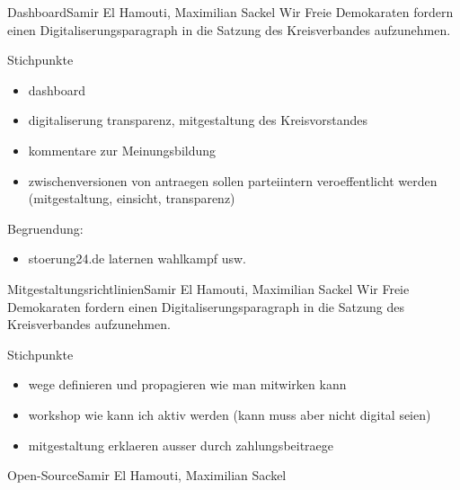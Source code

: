 \documentclass{amendment}
\date{18. August 2020}
\begin{document}
\begin{boxed}{Dashboard}{Samir El Hamouti, Maximilian Sackel}
Wir Freie Demokaraten fordern einen Digitaliserungsparagraph in die Satzung des
Kreisverbandes aufzunehmen.

Stichpunkte
\begin{itemize}
    \item dashboard
    \item digitaliserung transparenz, mitgestaltung des Kreisvorstandes
    \item kommentare zur Meinungsbildung
    \item zwischenversionen von antraegen sollen parteiintern veroeffentlicht
        werden (mitgestaltung, einsicht, transparenz)
\end{itemize}
Begruendung:
\begin{itemize}
    \item stoerung24.de laternen wahlkampf usw.
\end{itemize}
\end{boxed}

\begin{boxed}{Mitgestaltungsrichtlinien}{Samir El Hamouti, Maximilian Sackel}
Wir Freie Demokaraten fordern einen Digitaliserungsparagraph in die Satzung des
Kreisverbandes aufzunehmen.

Stichpunkte
\begin{itemize}
    \item wege definieren und propagieren wie man mitwirken kann
    \item workshop wie kann ich aktiv werden (kann muss aber nicht digital
        seien)
    \item mitgestaltung erklaeren ausser durch zahlungsbeitraege
\end{itemize}
\end{boxed}

\begin{boxed}{Open-Source}{Samir El Hamouti, Maximilian Sackel}
\end{boxed}
\end{document}
